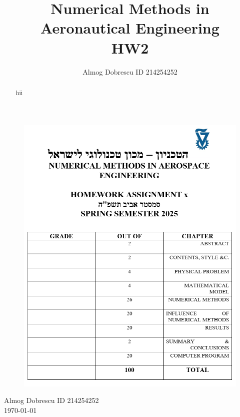 \documentclass[11pt, a4paper]{article}
\title{Numerical Methods in Aeronautical Engineering \\ HW2}
\author{Almog Dobrescu ID 214254252}
\begin{document}
\thispagestyle{empty}
\begin{figure}[H]
    \centering
    \includegraphics[width=\textwidth]{./../../Cover page for computational assignments 2025.png}
    \label{fig: cover page}
\end{figure}
\begin{center}
    \Huge
    Almog Dobrescu \qquad ID 214254252 \\ \vspace{0.5cm}
    \today
\end{center}
\newpage

\begin{abstract}
    hii
\end{abstract}

\tableofcontents
\vfil
\listoffigures
\vfil
\lstlistoflistings
\newpage

\printnomenclature
\newpage
\end{document}
